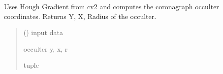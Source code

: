 \documentclass[letterpaper,10pt,english]{sphinxmanual}
\begin{document}
\begin{fulllineitems}
\label{\detokenize{micropolarray.processing:micropolarray.processing.nrgf.find_occulter_hough}}
\pysigstartsignatures
{}
\pysigstopsignatures
\sphinxAtStartPar
Uses Hough Gradient from cv2 and computes the coronagraph occulter coordinates. Returns Y, X, Radius of the occulter.
\begin{quote}\begin{description}
\sphinxAtStartPar
{} () \textendash{} input data

\sphinxAtStartPar
occulter y, x, r

\sphinxAtStartPar
tuple

\end{description}\end{quote}

\end{fulllineitems}

\end{document}
